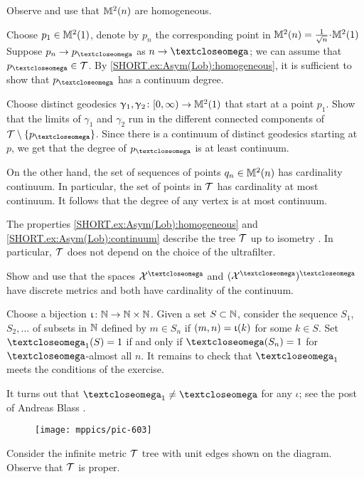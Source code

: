  Observe and use that $\mathbb{M}_{{}}^{2}({n})$ are homogeneous.

Choose $p_1\in \Lob21$, denote by $p_n$ the corresponding point in $\Lob2n\z=\tfrac1{\sqrt{n}}\cdot\Lob21$
Suppose $p_n\to p_\o$ as $n\to\o$; we can assume that $p_\o\in\spc{T}$.
By \ref{SHORT.ex:Asym(Lob):homogeneous}, it is sufficient to show that $p_\o$ has a continuum degree.

Choose distinct geodesics $\gamma_1,\gamma_2\:[0,\infty)\to \Lob21$ that start at a point $p_1$.
Show that the limits of $\gamma_1$ and $\gamma_2$ run in the different connected components of $\spc{T}\setminus \{p_\o\}$.
Since there is a continuum of distinct geodesics starting at $p$,
we get that the degree of $p_\o$ is at least continuum.

On the other hand, the set of sequences of points $q_n\in\Lob2n$  has cardinality continuum.
In particular, the set of points in $\mathcal{T}$ has cardinality at most continuum.
It follows that the degree of any vertex is at most continuum.

The properties \ref{SHORT.ex:Asym(Lob):homogeneous} and \ref{SHORT.ex:Asym(Lob):continuum} describe the tree $\mathcal{T}$ up to isometry \cite{dyubina-polterovich}.
In particular, $\mathcal{T}$ does not depend on the choice of the ultrafilter.

Show and use that the spaces $\spc{X}^\o$ and $(\spc{X}^\o)^\o$ have discrete metrics and both have cardinality of the continuum.

Choose a bijection $\iota\:\NN\to \NN\times \NN$.
Given a set $S\subset \NN$, consider the sequence $S_1$, $S_2,\dots$ of subsets in $\mathbb{N}$ defined by $m\in S_n$ if $(m,n)\z=\iota(k)$ for some $k\in S$.
Set $\o_1(S)=1$ if and only if $\o(S_n)=1$ for $\o$-almost all $n$.
It remains to check that $\o_1$ meets the conditions of the exercise.

It turns out that $\o_1\ne \o$ for any $\iota$;
see the post of Andreas Blass \cite{blass}.

\begin{wrapfigure}{r}{40 mm}
\vskip-0mm
\centering
\texttt{[image: mppics/pic-603]}
\end{wrapfigure}

 Consider the infinite metric $\mathcal{T}$ tree with unit edges shown
on the diagram. Observe that $\mathcal{T}$ is proper.

